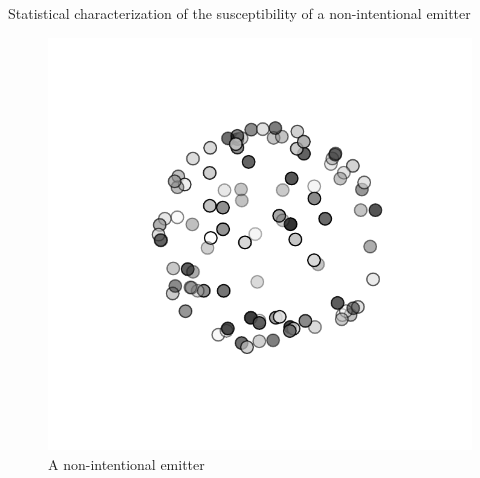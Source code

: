 \documentclass[final,hyperref={pdfpagelabels=false}]{beamer}
\begin{document}
\begin{frame}{}
\begin{columns}[t]
\begin{column}{0.32\linewidth}
\begin{block}{{Statistical characterization of the susceptibility of a non-intentional emitter}}
{\vspace{-0.6cm}
\begin{figure}
\includegraphics[trim=70 70 70 60,clip,width=0.3\columnwidth]{./img/eut}
\vspace{-0.3cm}
\large{\caption{A non-intentional emitter}}
\end{figure}}

\vspace{-0.6cm}
\begin{figure}
     \centering
    \\
\subfigure[$f=500$ MHz, $ka=10.5$, $D\approx 5.2$]{
             \label{fig_800M}      
}
\end{figure}
\end{block}
\end{column}
\end{columns}
\end{frame}
\end{document}

